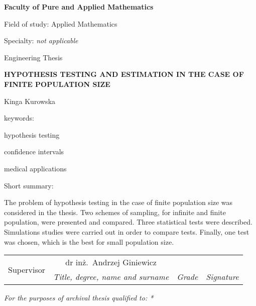 \documentclass[12pt,a4paper,twoside]{book}
\begin{document}
\begin{titlepage}
\noindent\textbf{\large Faculty of Pure and Applied Mathematics}
\par\medskip\noindent
Field of study: Applied Mathematics
\par\noindent
Specialty: \textit{not applicable}
\vspace*{36pt}
\begin{center}
\LARGE Engineering Thesis
\end{center}
\vspace*{24pt}
\begin{center}
\uppercase{\Large\bfseries%
Hypothesis Testing and Estimation in the Case of Finite Population Size}
\end{center}
\vspace*{12pt}
\begin{center}
Kinga Kurowska
\end{center}
\vspace*{12pt}
\begin{flushright}
keywords:\par\noindent
hypothesis testing\par\noindent
confidence intervals\par\noindent
medical applications \par\noindent
\end{flushright}
\begin{flushleft}
Short summary:\par
The problem of hypothesis testing in the case of finite population size was considered in the thesis. Two schemes of sampling, for infinite and finite population, were presented and compared. Three statistical tests were described. Simulations studies were carried out in order to compare tests. Finally, one test was chosen, which is the best for small population size.
\smallskip
\end{flushleft}
\begin{tabularx}{\textwidth}{|l|c|X|X|}
	\hline
	\multirow{2}{*}{\footnotesize Supervisor} & {\small dr inż.\ Andrzej Giniewicz} &  &  \\
	\cline{2-4}
	& \textit{\footnotesize Title, degree, name and surname} & \textit{\footnotesize Grade} & \textit{\footnotesize Signature} \\
	\hline
\end{tabularx}
\smallskip
\begin{flushleft}
\small\itshape
For the purposes of archival thesis qualified to: *
\begin{compactenum}

\end{compactenum}
\end{flushleft}
\end{titlepage}
\end{document}
